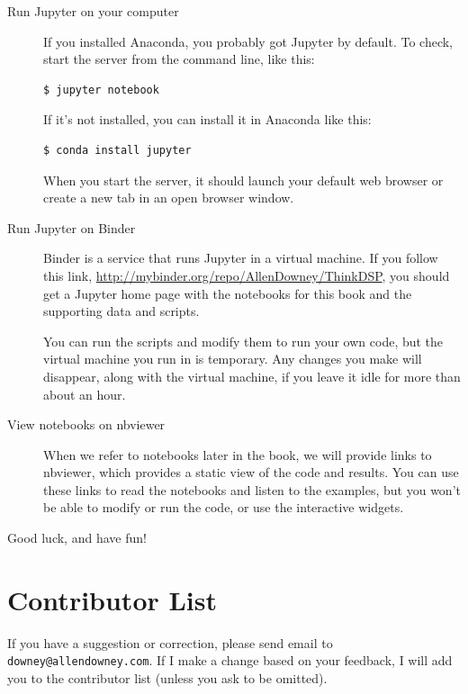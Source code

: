 \documentclass[12pt]{book}
\begin{document}
\begin{description}

\item[Run Jupyter on your computer]

If you installed Anaconda, you
  probably got Jupyter by default.  To check, start the server from
the command line, like this:

\begin{verbatim}
$ jupyter notebook
\end{verbatim}

If it's not installed, you can install it in Anaconda like this:

\begin{verbatim}
$ conda install jupyter
\end{verbatim}

When you start the server, it should launch your default web browser
or create a new tab in an open browser window.

\item[Run Jupyter on Binder]

Binder is a service that runs Jupyter in a virtual machine.  If you
follow this link, \url{http://mybinder.org/repo/AllenDowney/ThinkDSP},
you should get a Jupyter home page with the notebooks for this book
and the supporting data and scripts.

You can run the scripts and modify them to run your own code, but the
virtual machine you run in is temporary.  Any changes you make will
disappear, along with the virtual machine, if you leave it idle for
more than about an hour.

\item[View notebooks on nbviewer]

When we refer to notebooks later in the book, we will provide links to
nbviewer, which provides a static view of the code and results.  You
can use these links to read the notebooks and listen to the examples,
but you won't be able to modify or run the code, or use the
interactive widgets.

\end{description}

Good luck, and have fun!



\section*{Contributor List}

If you have a suggestion or correction, please send email to
{\tt downey@allendowney.com}.  If I make a change based on your
feedback, I will add you to the contributor list
(unless you ask to be omitted).
\end{document}
